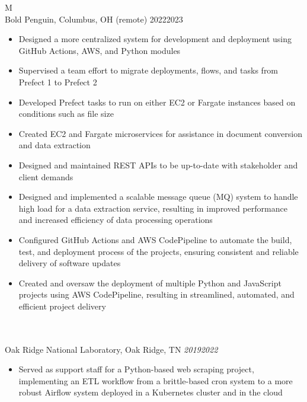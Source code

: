 \documentclass[10pt]{article}%
\begin{document}
    \begin{tabularx}{\linewidth}{M}%
         \\
        Bold Penguin, Columbus, OH (remote) 2022\textemdash{}2023 \\
        \begin{itemize}[topsep=-12pt,parsep=0em]
            \setlength\itemsep{0em}
            \item Designed a more centralized system for development and deployment using GitHub Actions, AWS, and Python modules %
            \item Supervised a team effort to migrate deployments, flows, and tasks from Prefect 1 to Prefect 2 %
            \item Developed Prefect tasks to run on either EC2 or Fargate instances based on conditions such as file size %
            \item Created EC2 and Fargate microservices for assistance in document conversion and data extraction %
            \item Designed and maintained REST APIs to be up-to-date with stakeholder and client demands %
            \item Designed and implemented a scalable message queue (MQ) system to handle high load for a data extraction service, resulting in improved performance and increased efficiency of data processing operations %
            \item Configured GitHub Actions and AWS CodePipeline to automate the build, test, and deployment process of the projects, ensuring consistent and reliable delivery of software updates %
            \item Created and oversaw the deployment of multiple Python and JavaScript projects using AWS CodePipeline, resulting in streamlined, automated, and efficient project delivery %
        \end{itemize} \\
         \\
        Oak Ridge National Laboratory, Oak Ridge, TN \textit{2019\textemdash{}2022} \\
        \begin{itemize}[topsep=-12pt,parsep=0em]
            \setlength\itemsep{0em}
            \item Served as support staff for a Python-based web scraping project, implementing an ETL workflow from a brittle-based cron system to a more robust Airflow system deployed in a Kubernetes cluster and in the cloud %

\end{itemize}
\end{tabularx}
\end{document}
